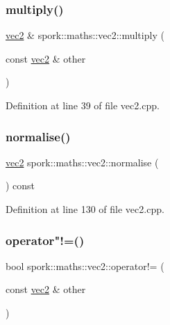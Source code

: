\subsubsection{\texorpdfstring{multiply()}{multiply()}}
{\footnotesize\ttfamily \hyperlink{structspork_1_1maths_1_1vec2}{vec2} \& spork\+::maths\+::vec2\+::multiply (\begin{DoxyParamCaption}\item[{const \hyperlink{structspork_1_1maths_1_1vec2}{vec2} \&}]{other }\end{DoxyParamCaption})}



Definition at line 39 of file vec2.\+cpp.

\mbox{\label{structspork_1_1maths_1_1vec2_a673f18bc75db7ac6b1612d4020cf087a}} 
\subsubsection{\texorpdfstring{normalise()}{normalise()}}
{\footnotesize\ttfamily \hyperlink{structspork_1_1maths_1_1vec2}{vec2} spork\+::maths\+::vec2\+::normalise (\begin{DoxyParamCaption}{ }\end{DoxyParamCaption}) const}



Definition at line 130 of file vec2.\+cpp.

\mbox{\label{structspork_1_1maths_1_1vec2_aeb16440e205e6a8012bc92d48b904600}} 
\subsubsection{\texorpdfstring{operator"!=()}{operator!=()}}
{\footnotesize\ttfamily bool spork\+::maths\+::vec2\+::operator!= (\begin{DoxyParamCaption}\item[{const \hyperlink{structspork_1_1maths_1_1vec2}{vec2} \&}]{other }\end{DoxyParamCaption})}



